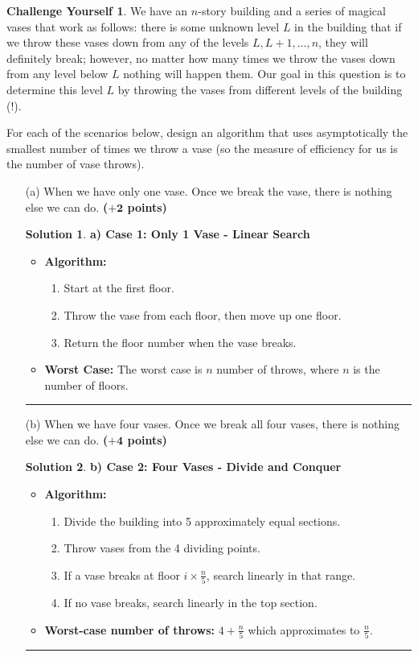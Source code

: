\documentclass{article}
\theoremstyle{definition}
\newtheorem*{challenge}{Challenge Yourself}
\def\fline{\rule{0.75\linewidth}{0.5pt}}
\newcommand{\finishline}{\begin{center}\fline\end{center}}
\newtheorem*{solution*}{Solution}
\newenvironment{solution}{\begin{solution*}}{{\finishline} \end{solution*}}
\newcommand{\grade}[1]{\hfill{\textbf{($\mathbf{#1}$ points)}}}
\begin{document}
\begin{challenge}
We have an $n$-story building and a series of magical vases that work as follows: there is some unknown level $L$ in the building that if we throw these vases down from any of the levels $L,L+1,\ldots,n$, they will definitely break; however, 
	no matter how many times we throw the vases down from any level below $L$ nothing will happen them. Our goal in this question is to determine this level $L$ by throwing the vases from different levels of the building (!). 
	
	For each of the scenarios below, design an algorithm that uses asymptotically the smallest number of times we throw a vase (so the measure of efficiency for us is the number of vase throws). 
	\begin{enumerate}
	\item[(a)] When we have only one vase. Once we break the vase, there is nothing else we can do. \grade{+2} 
	
	
    	\begin{solution}
		\textbf{a) Case 1: Only 1 Vase - Linear Search}
		\begin{itemize}
		\item \textbf{Algorithm:}
		\begin{enumerate}
			\item Start at the first floor.
			\item Throw the vase from each floor, then move up one floor.
			\item Return the floor number when the vase breaks.
		\end{enumerate}
		\item \textbf{Worst Case:} The worst case is \( n \) number of throws, where \( n \) is the number of floors.
		\end{itemize}
	\end{solution}


	\item[(b)] When we have  four vases. Once we break all four vases, there is nothing else we can do. \grade{+4} 
	
	
    	\begin{solution}
		\textbf{b) Case 2: Four Vases - Divide and Conquer}
		\begin{itemize}
		    \item \textbf{Algorithm:}
		    \begin{enumerate}
			\item Divide the building into 5 approximately equal sections.
			\item Throw vases from the 4 dividing points.
			\item If a vase breaks at floor \( i \times \frac{n}{5} \), search linearly in that range.
			\item If no vase breaks, search linearly in the top section.
		    \end{enumerate}
		    \item \textbf{Worst-case number of throws:} \( 4 + \frac{n}{5} \) which approximates to \( \frac{n}{5} \).
		\end{itemize}
	\end{solution}



\end{enumerate}
\end{challenge}
\end{document}

